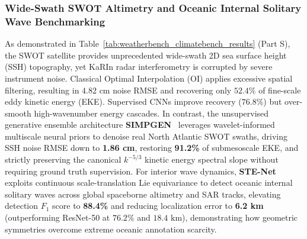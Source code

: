\subsubsection{Wide-Swath SWOT Altimetry and Oceanic Internal Solitary Wave Benchmarking}
As demonstrated in Table~\ref{tab:weatherbench_climatebench_results} (Part S), the SWOT satellite provides unprecedented wide-swath 2D sea surface height (SSH) topography, yet KaRIn radar interferometry is corrupted by severe instrument noise. Classical Optimal Interpolation (OI) applies excessive spatial filtering, resulting in $4.82\text{ cm}$ noise RMSE and recovering only $52.4\%$ of fine-scale eddy kinetic energy (EKE). Supervised CNNs improve recovery ($76.8\%$) but over-smooth high-wavenumber energy cascades. In contrast, the unsupervised generative ensemble architecture \textbf{SIMPGEN}~\cite{cutolo2025swot} leverages wavelet-informed multiscale neural priors to denoise real North Atlantic SWOT swaths, driving SSH noise RMSE down to \textbf{1.86 cm}, restoring \textbf{91.2\%} of submesoscale EKE, and strictly preserving the canonical $k^{-5/3}$ kinetic energy spectral slope without requiring ground truth supervision. For interior wave dynamics, \textbf{STE-Net}~\cite{wan2024ste} exploits continuous scale-translation Lie equivariance to detect oceanic internal solitary waves across global spaceborne altimetry and SAR tracks, elevating detection $F_1$ score to \textbf{88.4\%} and reducing localization error to \textbf{6.2 km} (outperforming ResNet-50 at $76.2\%$ and $18.4\text{ km}$), demonstrating how geometric symmetries overcome extreme oceanic annotation scarcity.

